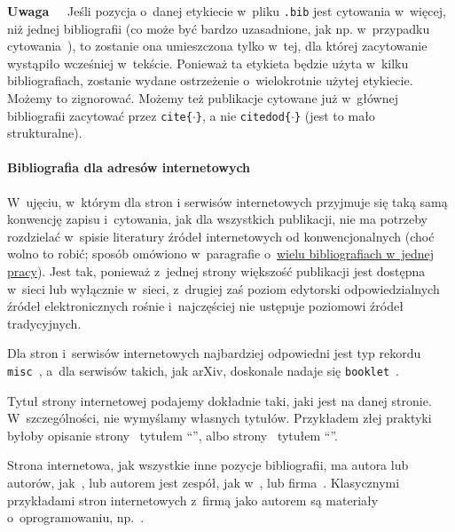 {\bf Uwaga~~} Jeśli pozycja o~danej etykiecie w~pliku {\tt *.bib} jest cytowania w~więcej, niż jednej bibliografii (co może być bardzo uzasadnione, jak np. w~przypadku cytowania~), to zostanie ona umieszczona tylko w~tej, dla której zacytowanie wystąpiło wcześniej w~tekście. Ponieważ ta etykieta będzie użyta w~kilku bibliografiach, zostanie wydane ostrzeżenie o~wielokrotnie użytej etykiecie. Możemy to zignorować. Możemy też publikacje cytowane już w~głównej bibliografii zacytować przez {\tt \tbs{}cite\{$\cdot$\}}, a nie {\tt \tbs{}citedod\{$\cdot$\}} (jest to mało strukturalne).


\paragraph{Bibliografia dla adresów internetowych}
\label{sec:dod:bibliografia-url}

W~ujęciu, w~którym dla stron i serwisów internetowych przyjmuje się taką samą konwencję zapisu i~cytowania, jak dla wszystkich publikacji, nie ma potrzeby rozdzielać w~spisie literatury źródeł internetowych od konwencjonalnych (choć wolno to robić; sposób omówiono w~paragrafie o~\hyperref[sec:dod:bibliografia-wiele]{wielu bibliografiach w~jednej pracy}). Jest tak, ponieważ z~jednej strony większość publikacji jest dostępna w~sieci lub wyłącznie w~sieci, z~drugiej zaś poziom edytorski odpowiedzialnych źródeł elektronicznych rośnie i~najczęściej nie ustępuje poziomowi źródeł tradycyjnych.

Dla stron i~serwisów internetowych najbardziej odpowiedni jest typ rekordu {\tt misc}~, a~dla serwisów takich, jak arXiv, doskonale nadaje się {\tt booklet}~.

Tytuł strony internetowej podajemy dokładnie taki, jaki jest na danej stronie. W~szczególności, nie wymyślamy własnych tytułów. Przykładem złej praktyki byłoby opisanie strony~ tytułem ``'', albo strony~ tytułem ``''.

Strona internetowa, jak wszystkie inne pozycje bibliografii, ma autora lub autorów, jak~, lub autorem jest zespół, jak w~, lub firma~. Klasycznymi przykładami stron internetowych z~firmą jako autorem są materiały o~oprogramowaniu, np.~.

